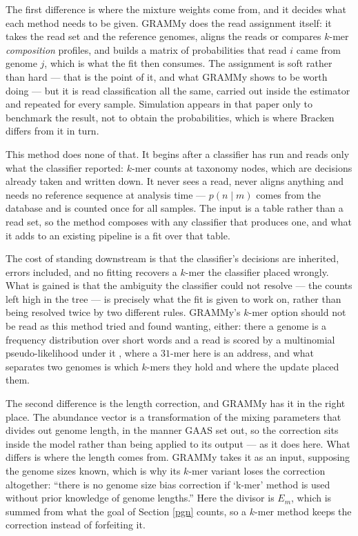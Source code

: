 \documentclass[pdflatex,sn-vancouver-num]{sn-jnl}
\begin{document}
    The first difference is where the mixture weights come from, and it decides what each method
    needs to be given. GRAMMy does the read assignment itself: it takes the read set and the
    reference genomes, aligns the reads or compares $k$-mer \emph{composition} profiles, and builds a
    matrix of probabilities that read $i$ came from genome $j$, which is what the fit then consumes.
    The assignment is soft rather than hard --- that is the point of it, and what GRAMMy shows to be
    worth doing --- but it is read classification all the same, carried out inside the estimator and
    repeated for every sample. Simulation appears in that paper only to benchmark the result, not to
    obtain the probabilities, which is where Bracken differs from it in turn.

    This method does none of that. It begins after a classifier has run and reads only what the
    classifier reported: $k$-mer counts at taxonomy nodes, which are decisions already taken and
    written down. It never sees a read, never aligns anything and needs no reference sequence at
    analysis time --- $p(n \mid m)$ comes from the database and is counted once for all samples. The
    input is a table rather than a read set, so the method composes with any classifier that produces
    one, and what it adds to an existing pipeline is a fit over that table.

    The cost of standing downstream is that the classifier's decisions are inherited, errors
    included, and no fitting recovers a $k$-mer the classifier placed wrongly. What is gained is that
    the ambiguity the classifier could not resolve --- the counts left high in the tree --- is
    precisely what the fit is given to work on, rather than being resolved twice by two different
    rules. GRAMMy's $k$-mer option should not be read as this method tried and found wanting, either:
    there a genome is a frequency distribution over short words and a read is scored by a multinomial
    pseudo-likelihood under it \citep{sandberg2001composition}, where a $31$-mer here is an address,
    and what separates two genomes is which $k$-mers they hold and where the update placed them.

    The second difference is the length correction, and GRAMMy has it in the right place. The
    abundance vector is a transformation of the mixing parameters that divides out genome length, in
    the manner GAAS set out, so the correction sits inside the model rather than being applied to its
    output --- as it does here. What differs is where the length comes from. GRAMMy takes it as an
    input, supposing the genome sizes known, which is why its $k$-mer variant loses the correction
    altogether: \enquote{there is no genome size bias correction if `k-mer' method is used without
    prior knowledge of genome lengths.} Here the divisor is $E_m$, which is summed from what the goal
    of Section \ref{pgn} counts, so a $k$-mer method keeps the correction
    instead of forfeiting it.
\end{document}
